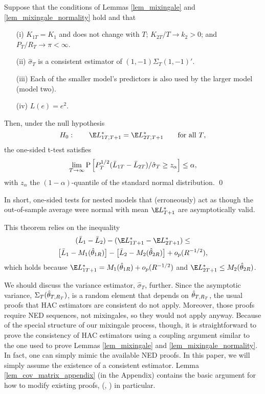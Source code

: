 \documentclass[11pt]{article} \def\baselinestretch{1.08}
\begin{document}
\begin{thm}\label{thm_nesting1}
  Suppose that the conditions of Lemmas \ref{lem_mixingale} and
  \ref{lem_mixingale_normality} hold and that
  \begin{enumerate}
  \item[(i)] $K_{1T} = K_1$ and does not change with $T$; $K_{2T}/T \to
    k_2 > 0$; and $P_T/R_T \to \pi < \infty$. 
  \item[(ii)] $\hat \sigma_T$ is a consistent estimator of $(1,-1) \Sigma_T
    (1,-1)'$.
  \item[(iii)] Each of the smaller model's predictors is also used by
  the larger model (model two).
  \item[(iv)] $L(e) = e^2$.
  \end{enumerate}
  Then, under the null hypothesis
  \[
  H_0: \qquad \mT{1} = \mT{2} \qquad \text{for all $T$,}
  \]
  the one-sided t-test satisfies
  \begin{equation*}
    \lim_{T\to\infty} \operatorname{P}\Big[P_T^{1/2} (\bar L_{{1}T} - \bar L_{{2}T}) / \hat \sigma_T  \geq
    z_\alpha \Big] \leq \alpha,
  \end{equation*}
  with $z_\alpha$ the $(1-\alpha)$-quantile of the standard normal
  distribution.
  \qed
\end{thm}
In short, one-sided tests for nested models that (erroneously) act as
though the out-of-sample average were normal with mean $\m{}$ are
asymptotically valid.

This theorem relies on the inequality
\begin{multline} \label{eq_nesting_inequality}
  (\el{1} - \el{2}) - (\m{1} - \m{2}) \leq \\
\big[\el{1} - \mmr{1}\big] - \big[\el{2} - \mmr{2}\big] + o_p(R^{-1/2}),
\end{multline}
which holds because $\m{1} = \mmr{1} + o_p(R^{-1/2})$ and $\m{2} \leq
\mmr{2}$.

We should discuss the variance estimator, $\hat \sigma_T$, further.
Since the asymptotic variance, $\Sigma_T({\hat \theta_{{}T,{R_T}}})$, is a random element that
depends on $\hat \theta_{{}T,{R_T}}$, the usual proofs that HAC estimators are
consistent do not apply.  Moreover, those proofs require NED
sequences, not mixingales, so they would not apply anyway.  Because of
the special structure of our mixingale process, though, it is
straightforward to prove the consistency of HAC estimators using a
coupling argument similar to the one used to prove Lemmas
\ref{lem_mixingale} and \ref{lem_mixingale_normality}.  In fact, one
can simply mimic the available NED proofs.  In this paper, we will
simply assume
the existence of a consistent estimator.  Lemma
\ref{lem_cov_matrix_appendix} (in the Appendix) contains the basic
argument for how to modify existing proofs,
(\citeyear*{davidson_consistency_1998},
\citeyear*{davidson_consistency_2000}) in particular.
\end{document}
